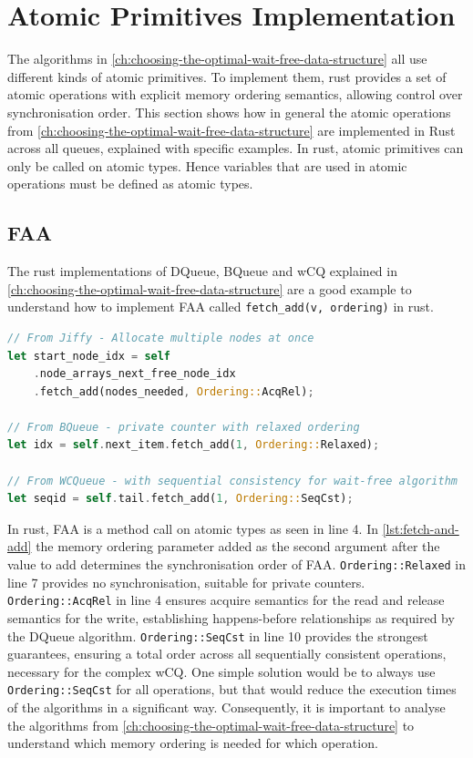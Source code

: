 \section{Atomic Primitives Implementation}

The algorithms in \cref{ch:choosing-the-optimal-wait-free-data-structure} all use different kinds of atomic primitives. To implement them, rust provides a set of atomic operations with explicit memory ordering semantics, allowing control over synchronisation order. This section shows how in general the atomic operations from \cref{ch:choosing-the-optimal-wait-free-data-structure} are implemented in Rust across all queues, explained with specific examples. In rust, atomic primitives can only be called on atomic types. Hence variables that are used in atomic operations must be defined as atomic types.

\subsection{\acf{FAA}}

The rust implementations of DQueue, BQueue and \ac{wCQ} explained in \cref{ch:choosing-the-optimal-wait-free-data-structure} are a good example to understand how to implement \ac{FAA} called \texttt{fetch\_add(v, ordering)} in rust.

\begin{lstlisting}[language=Rust, style=boxed, caption={Fetch-and-add with different memory orderings}, label={lst:fetch-and-add}]
// From Jiffy - Allocate multiple nodes at once
let start_node_idx = self
    .node_arrays_next_free_node_idx
    .fetch_add(nodes_needed, Ordering::AcqRel);

// From BQueue - private counter with relaxed ordering
let idx = self.next_item.fetch_add(1, Ordering::Relaxed);

// From WCQueue - with sequential consistency for wait-free algorithm
let seqid = self.tail.fetch_add(1, Ordering::SeqCst);
\end{lstlisting}

In rust, \ac{FAA} is a method call on atomic types as seen in line 4. In \cref{lst:fetch-and-add} the memory ordering parameter added as the second argument after the value to add determines the synchronisation order of \ac{FAA}. \texttt{Ordering::Relaxed} in line 7 provides no synchronisation, suitable for private counters. \texttt{Ordering::AcqRel} in line 4 ensures acquire semantics for the read and release semantics for the write, establishing happens-before relationships as required by the DQueue algorithm. \texttt{Ordering::SeqCst} in line 10 provides the strongest guarantees, ensuring a total order across all sequentially consistent operations, necessary for the complex \ac{wCQ}. One simple solution would be to always use \texttt{Ordering::SeqCst} for all operations, but that would reduce the execution times of the algorithms in a significant way. Consequently, it is important to analyse the algorithms from \cref{ch:choosing-the-optimal-wait-free-data-structure} to understand which memory ordering is needed for which operation.

